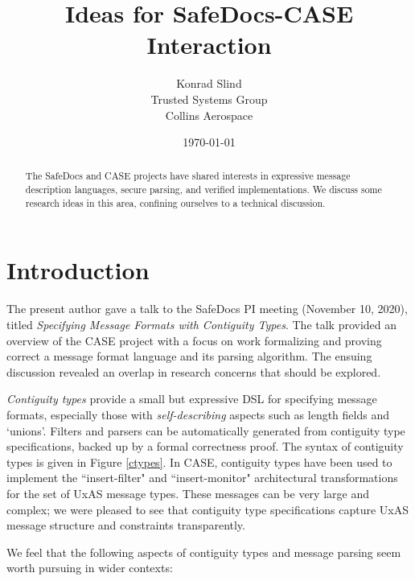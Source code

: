 \documentclass{article}
\theoremstyle{definition}
\begin{document}
\title{Ideas for SafeDocs-CASE Interaction}
\author{Konrad Slind \\ Trusted Systems Group \\ Collins Aerospace}
\date{\today}

\begin{abstract}
The SafeDocs and CASE projects have shared interests in expressive
message description languages, secure parsing, and verified
implementations. We discuss some research ideas in this area,
confining ourselves to a technical discussion.
\end{abstract}

\maketitle

\section*{Introduction}

The present author gave a talk to the SafeDocs PI meeting (November
10, 2020), titled \emph{Specifying Message Formats with Contiguity
  Types}. The talk provided an overview of the CASE project with a
focus on work formalizing and proving correct a message format
language and its parsing algorithm. The ensuing discussion revealed an
overlap in research concerns that should be explored.

\emph{Contiguity types} provide a small but expressive DSL for
specifying message formats, especially those with
\emph{self-describing} aspects such as length fields and
`unions'. Filters and parsers can be automatically generated from
contiguity type specifications, backed up by a formal correctness
proof. The syntax of contiguity types is given in Figure \ref{ctypes}.
In CASE, contiguity types have been used to implement the
``insert-filter" and ``insert-monitor" architectural transformations for
the set of UxAS message types. These messages can be very large and
complex; we were pleased to see that contiguity type specifications
capture UxAS message structure and constraints transparently.

We feel that the following aspects of contiguity types and message
parsing seem worth pursuing in wider contexts:
\end{document}
